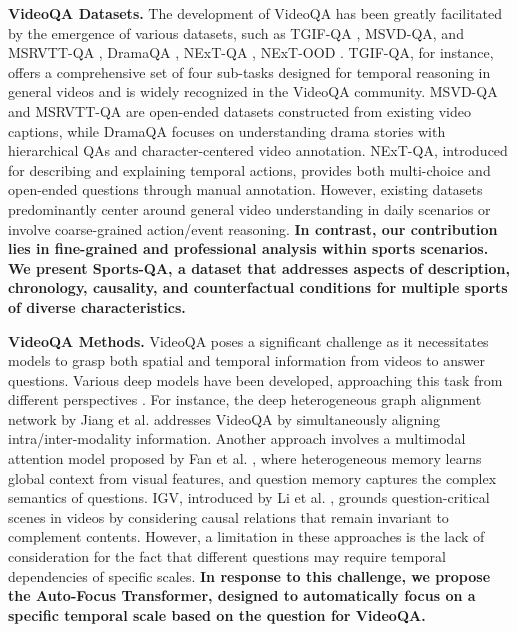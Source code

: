 {\noindent\textbf{VideoQA Datasets.}  The development of VideoQA has been greatly facilitated by the emergence of various datasets, such as TGIF-QA \citep{jang2017tgif}, MSVD-QA, and MSRVTT-QA \citep{xu2017video}, DramaQA \citep{choi2021dramaqa}, NExT-QA \citep{xiao2021next}, NExT-OOD \citep{10107423}. TGIF-QA, for instance, offers a comprehensive set of four sub-tasks designed for temporal reasoning in general videos and is widely recognized in the VideoQA community. MSVD-QA and MSRVTT-QA are open-ended datasets constructed from existing video captions, while DramaQA focuses on understanding drama stories with hierarchical QAs and character-centered video annotation. NExT-QA, introduced for describing and explaining temporal actions, provides both multi-choice and open-ended questions through manual annotation. However, existing datasets predominantly center around general video understanding in daily scenarios or involve coarse-grained action/event reasoning. \textbf{In contrast, our contribution lies in fine-grained and professional analysis within sports scenarios. We present Sports-QA, a dataset that addresses aspects of description, chronology, causality, and counterfactual conditions for multiple sports of diverse characteristics.}

\noindent\textbf{VideoQA Methods.} 
VideoQA poses a significant challenge as it necessitates models to grasp both spatial and temporal information from videos to answer questions. Various deep models have been developed, approaching this task from different perspectives \citep{fan2019heterogeneous,jiang2020reasoning,li2022invariant,antol2015vqa,gao2018motion,10172254,9770842,10214041,10146482}.
For instance, the deep heterogeneous graph alignment network by Jiang et al. \citep{jiang2020reasoning} addresses VideoQA by simultaneously aligning intra/inter-modality information. Another approach involves a multimodal attention model proposed by Fan et al. \citep{fan2019heterogeneous}, where heterogeneous memory learns global context from visual features, and question memory captures the complex semantics of questions.
IGV, introduced by Li et al. \citep{li2022invariant}, grounds question-critical scenes in videos by considering causal relations that remain invariant to complement contents.
However, a limitation in these approaches is the lack of consideration for the fact that different questions may require temporal dependencies of specific scales. \textbf{In response to this challenge, we propose the Auto-Focus Transformer, designed to automatically focus on a specific temporal scale based on the question for VideoQA.}


}

